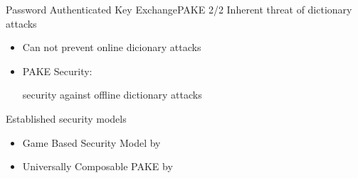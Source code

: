 \documentclass[notes,xcolor=dvipsnames]{beamer}
\begin{document}
\begin{frame}{Password Authenticated Key Exchange}{PAKE 2/2}
	Inherent threat of dictionary attacks
	\begin{itemize}
		\item Can not prevent online dicionary attacks
		\item PAKE Security:\\\begin{center} \alert{security against offline dictionary attacks}\end{center}
	\end{itemize}
	
	\vspace*{2em}
	Established security models
	\begin{itemize}
		\item Game Based Security Model by \cite{Bellare2000}%
		\item Universally Composable PAKE by \cite{Canetti2005}%
	\end{itemize}
\end{frame}
\end{document}

